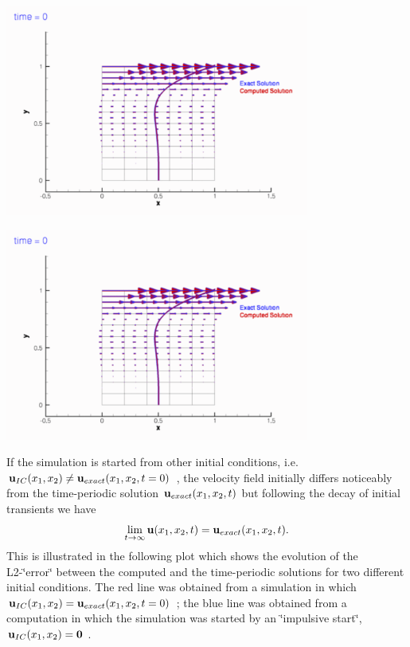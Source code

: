  
\begin{DoxyImage}
\includegraphics[width=0.75\textwidth]{velocity_vectors_CR}
\end{DoxyImage}


 
\begin{DoxyImage}
\includegraphics[width=0.75\textwidth]{velocity_vectors_TH}
\end{DoxyImage}


If the simulation is started from other initial conditions, i.\+e. $ {\bf u}_{IC}(x_1,x_2) \ne {\bf u}_{exact}(x_1,x_2,t=0)$ , the velocity field initially differs noticeably from the time-\/periodic solution $ {\bf u}_{exact}(x_1,x_2,t)$ but following the decay of initial transients we have \[ \lim_{t\to \infty} {\bf u}(x_1,x_2,t) = {\bf u}_{exact}(x_1,x_2,t). \] This is illustrated in the following plot which shows the evolution of the L2-\/\char`\"{}error\char`\"{} between the computed and the time-\/periodic solutions for two different initial conditions. The red line was obtained from a simulation in which $ {\bf u}_{IC}(x_1,x_2) = {\bf u}_{exact}(x_1,x_2,t=0)$ ; the blue line was obtained from a computation in which the simulation was started by an \char`\"{}impulsive start\char`\"{}, $ {\bf u}_{IC}(x_1,x_2) = {\bf 0}$ .

